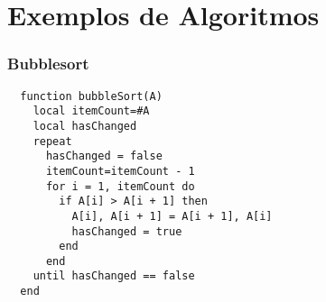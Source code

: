 \documentclass{ime-beamer}
\begin{document}
\section{Exemplos de Algoritmos}
\begin{frame}[fragile]
  \frametitle{Bubblesort}
  \begin{lstlisting}
  function bubbleSort(A)
    local itemCount=#A
    local hasChanged
    repeat
      hasChanged = false
      itemCount=itemCount - 1
      for i = 1, itemCount do
        if A[i] > A[i + 1] then
          A[i], A[i + 1] = A[i + 1], A[i]
          hasChanged = true
        end
      end
    until hasChanged == false
  end
  \end{lstlisting}
\end{frame}
\end{document}
